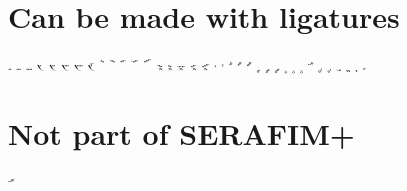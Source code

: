 \documentclass[12pt]{article}
\begin{document}
\section*{Can be made with ligatures}
{\Neume

\hspace{0.5em}
𝂆
\hspace{0.5em}
𝂇
\hspace{0.5em}
𝂈
\hspace{0.5em}
𝂊 𝂋 𝂌 𝂍 𝂎
\hspace{0.5em}
𝂘
\hspace{0.5em}
𝂙
\hspace{0.5em}
𝂒
\hspace{0.5em}
𝂓
\hspace{0.5em}
𝂖
\hspace{0.5em}
𝂚 𝂛 𝂝 𝂠 𝂡 
\hspace{0.5em}
𝃜
\hspace{0.5em}
𝃝
\hspace{0.5em}
𝃕
\hspace{0.5em}
𝃖
\hspace{0.5em}
𝃗
\hspace{0.5em}
𝃑
\hspace{0.5em}
𝃒
\hspace{0.5em}
𝃓
\hspace{0.5em}
𝃟
\hspace{0.5em}
𝃠
\hspace{0.5em}
𝃡
\hspace{0.5em}
𝃍
\hspace{0.5em}
𝃎
\hspace{0.5em}
𝃏
\hspace{0.5em}
𝃴
\hspace{0.5em}
𝃲
\hspace{0.5em}
𝃳
\hspace{0.5em}
𝃵
}

\section*{Not part of SERAFIM+}

{\setmainfont{EEMusic}\hspace{1em}𝃌}
\end{document}
